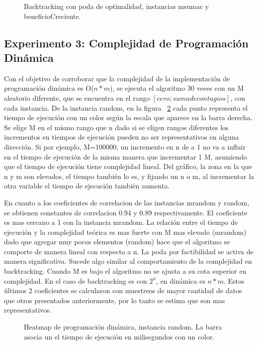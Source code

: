 \documentclass[10pt,a4paper]{article}
\begin{document}
\begin{figure}[H]
    \centering
    
    \caption{Backtracking con poda de optimalidad, instancias msumac y beneficioCreciente.}
    \label{fig:bt-o-msumac-beneficioCreciente}
\end{figure}

\subsection{Experimento 3: Complejidad de Programación Dinámica}

Con el objetivo de corroborar que la complejidad de la implementación de programación dinámica es O($n*m$), se ejecuta el algoritmo 30 veces con un M aleatorio diferente, que se encuentra en el rango $[cero; suma de contagios]$, con cada instancia. De la instancia random, en la figura ~\ref{fig:dp-heatmap-random} cada punto representa el tiempo de ejecución con un color según la escala que aparece en la barra derecha. Se elige M en el mismo rango que n dado si se eligen rangos diferentes los incrementos en tiempos de ejecución pueden no ser representativos en alguna dirección. Si por ejemplo, M=100000, un incremento en n de a 1 no va a influir en el tiempo de ejecución de la misma manera que incrementar 1 M, asumiendo que el tiempo de ejecución tiene complejidad lineal. Del gráfico, la zona en la que n y m son elevados, el tiempo también lo es, y fijando un n o m, al incrementar la otra variable el tiempo de ejecución también aumenta. 

En cuanto a los coeficientes de correlacion de las instancias mrandom y random, se obtienen constantes de correlacion 0.94 y 0.89 respectivamente. El coeficiente es mas cercano a 1 con la instancia mrandom. La relación entre el tiempo de ejecución y la complejidad teórica es mas fuerte con M mas elevado (mrandom) dado que agregar muy pocos elementos (random) hace que el algoritmo se comporte de manera lineal con respecto a n. La poda por factibilidad se activa de manera significativa. Sucede algo similar al comportamiento de la complejidad en backtracking. Cuando M es bajo el algoritmo no se ajusta a su cota superior en complejidad. En el caso de backtracking es con $2^n$, en dinámica es $n*m$. Estos últimos 2 coeficientes se calcularon con muestreos de mayor cantidad de datos que otros presentados anteriormente, por lo tanto se estima que son mas representativos.

\begin{figure}[H]
    \centering
    
    \caption{Heatmap de programación dinámica, instancia random. La barra asocia un el tiempo de ejecución en milisegundos con un color. }
    \label{fig:dp-heatmap-random}
\end{figure}
\end{document}
